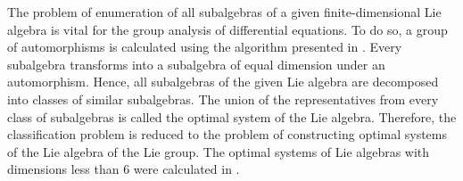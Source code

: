 \documentclass[12pt]{amsart}
\begin{document}
The problem of enumeration of all subalgebras of a given finite-dimensional Lie algebra is vital for the group analysis of differential equations. To do so, a group of automorphisms is calculated using the algorithm presented in \cite{PateraWinternitz1977}. Every subalgebra transforms into a subalgebra of equal dimension under an automorphism. Hence, all subalgebras of the given Lie algebra are decomposed into classes of similar subalgebras. The union of the representatives from every class of subalgebras is called the optimal system of the Lie algebra. Therefore, the classification problem is reduced to the problem of constructing optimal systems of the Lie algebra of the Lie group. The optimal systems of Lie algebras with dimensions less than 6 were calculated in \cite{PateraWinternitz1977}.
 
\end{document}

